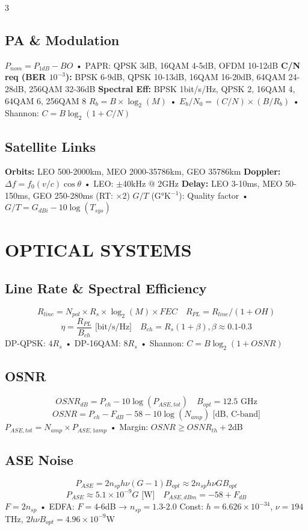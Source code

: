 \documentclass[a4paper,6pt]{extarticle}
\begin{document}
\begin{multicols}{3}
\subsection*{PA \& Modulation}
$P_{nom} = P_{1dB} - BO$ • PAPR: QPSK 3dB, 16QAM 4-5dB, OFDM 10-12dB
\textbf{C/N req (BER $10^{-3}$):} BPSK 6-9dB, QPSK 10-13dB, 16QAM 16-20dB, 64QAM 24-28dB, 256QAM 32-36dB
\textbf{Spectral Eff:} BPSK 1bit/s/Hz, QPSK 2, 16QAM 4, 64QAM 6, 256QAM 8
$R_b = B \times \log_2(M)$ • $E_b/N_0 = (C/N) \times (B/R_b)$ • Shannon: $C = B\log_2(1+C/N)$

\subsection*{Satellite Links}
\textbf{Orbits:} LEO 500-2000km, MEO 2000-35786km, GEO 35786km
\textbf{Doppler:} $\Delta f = f_0 (v/c) \cos\theta$ • LEO: $\pm$40kHz @ 2GHz
\textbf{Delay:} LEO 3-10ms, MEO 50-150ms, GEO 250-280ms (RT: ×2)
$G/T$ (G°K$^{-1}$): Quality factor • $G/T = G_{dBi} - 10\log(T_{sys})$

\section*{OPTICAL SYSTEMS}

\subsection*{Line Rate \& Spectral Efficiency}
$$R_{line} = N_{pol} \times R_s \times \log_2(M) \times FEC \quad R_{PL} = R_{line}/(1+OH)$$
$$\eta = \frac{R_{PL}}{B_{ch}} \text{ [bit/s/Hz]} \quad B_{ch} = R_s(1+\beta), \beta \approx 0.1\text{-}0.3$$
DP-QPSK: $4R_s$ • DP-16QAM: $8R_s$ • Shannon: $C = B\log_2(1+OSNR)$

\subsection*{OSNR}
$$OSNR_{dB} = P_{ch} - 10\log(P_{ASE,tot}) \quad B_{opt} = 12.5 \text{ GHz}$$
$$\boxed{OSNR = P_{ch} - F_{dB} - 58 - 10\log(N_{amp})} \text{ [dB, C-band]}$$
$P_{ASE,tot} = N_{amp} \times P_{ASE,1amp}$ • Margin: $OSNR \geq OSNR_{th} + 2$dB

\subsection*{ASE Noise}
$$P_{ASE} = 2n_{sp}h\nu(G-1)B_{opt} \approx 2n_{sp}h\nu GB_{opt}$$
$$P_{ASE} \approx 5.1 \times 10^{-9} G \text{ [W]} \quad P_{ASE,dBm} = -58 + F_{dB}$$
$F = 2n_{sp}$ • EDFA: $F = 4\text{-}6$dB → $n_{sp} = 1.3\text{-}2.0$
Const: $h = 6.626 \times 10^{-34}$, $\nu = 194$THz, $2h\nu B_{opt} = 4.96 \times 10^{-9}$W


\end{multicols}
\end{document}
